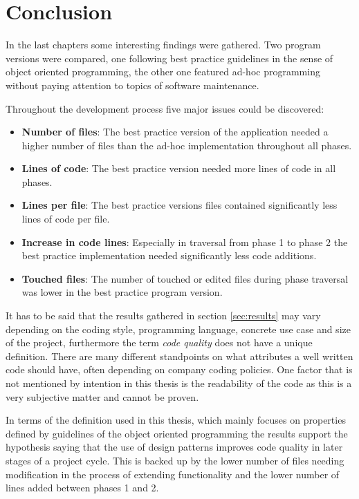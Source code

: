 \chapter{Conclusion}

In the last chapters some interesting findings were gathered. Two program versions were compared, one following best practice guidelines in the sense of object oriented programming, the other one featured ad-hoc programming without paying attention to topics of software maintenance.

Throughout the development process five major issues could be discovered:

\begin{itemize}
	\item \textbf{Number of files}: The best practice version of the application needed a higher number of files than the ad-hoc implementation throughout all phases.
	\item \textbf{Lines of code}: The best practice version needed more lines of code in all phases.
	\item \textbf{Lines per file}: The best practice versions files contained significantly less lines of code per file.
	\item \textbf{Increase in code lines}: Especially in traversal from phase 1 to phase 2 the best practice implementation needed significantly less code additions.
	\item \textbf{Touched files}: The number of touched or edited files during phase traversal was lower in the best practice program version.
\end{itemize}

It has to be said that the results gathered in section \ref{sec:results} may vary depending on the coding style, programming language, concrete use case and size of the project, furthermore the term \emph{code quality} does not have a unique definition. There are many different standpoints on what attributes a well written code should have, often depending on company coding policies. One factor that is not mentioned by intention in this thesis is the readability of the code as this is a very subjective matter and cannot be proven. 

In terms of the definition used in this thesis, which mainly focuses on properties defined by guidelines of the object oriented programming the results support the hypothesis saying that the use of design patterns improves code quality in later stages of a project cycle. This is backed up by the lower number of files needing modification in the process of extending functionality and the lower number of lines added between phases 1 and 2. 

